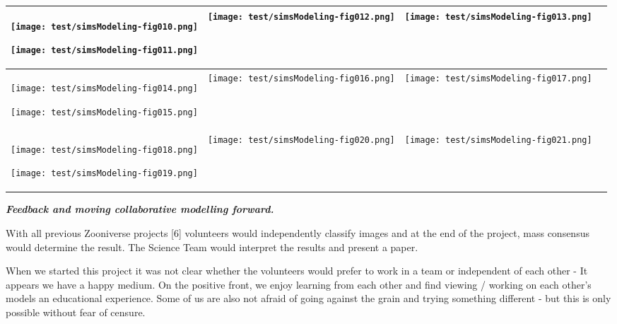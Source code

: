 \documentclass{article}
\begin{document}
\begin{tabular}{|>{\raggedright}p{76pt}|>{\raggedright}p{75pt}|>{\raggedright}p{75pt}|>{\raggedright}p{75pt}|}
\hline

\texttt{[image: test/simsModeling-fig010.png]}

\texttt{[image: test/simsModeling-fig011.png]}
 & 
\texttt{[image: test/simsModeling-fig012.png]}
 & 
\texttt{[image: test/simsModeling-fig013.png]}
 & \tabularnewline
\hline

\texttt{[image: test/simsModeling-fig014.png]}

\texttt{[image: test/simsModeling-fig015.png]}
 & 
\texttt{[image: test/simsModeling-fig016.png]}
 & 
\texttt{[image: test/simsModeling-fig017.png]}
 & \tabularnewline
\hline

\texttt{[image: test/simsModeling-fig018.png]}

\texttt{[image: test/simsModeling-fig019.png]}
 & 
\texttt{[image: test/simsModeling-fig020.png]}
 & 
\texttt{[image: test/simsModeling-fig021.png]}
 & \tabularnewline
\hline
\end{tabular}

\vspace{13pt}
\textbf{\emph{Feedback and moving collaborative modelling forward.}}

With all previous Zooniverse projects {\small{}[6]} volunteers would independently 
classify images and at the end of the project, mass consensus would determine the 
result. The Science Team would interpret the results and present a paper.  

When we started this project it was not clear whether the volunteers would prefer 
to work in a team or independent of each other - It appears we have a happy medium. 
On the positive front, we enjoy learning from each other and find viewing / working 
on each other's models an educational experience. Some of us are also not afraid 
of going against the grain and trying something different - but this is only possible 
without fear of censure. 
\end{document}
